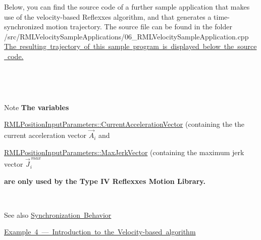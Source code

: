 Below, you can find the source code of a further sample application that makes use of the velocity-\/based Reflexxes algorithm, and that generates a time-\/synchronized motion trajectory. The source file can be found in the folder~\newline
~\newline
{\ttfamily /src/\+R\+M\+L\+Velocity\+Sample\+Applications/06\+\_\+\+R\+M\+L\+Velocity\+Sample\+Application.cpp}~\newline
~\newline
\mbox{\hyperlink{page_Code_06_RMLVelocitySampleApplication_anc_VelocityExample6}{The resulting trajectory of this sample program is displayed below the source code.}} ~\newline
~\newline
 
\begin{DoxyCodeInclude}{0}
\end{DoxyCodeInclude}


~\newline
~\newline
\label{page_Code_06_RMLVelocitySampleApplication_anc_VelocityExample6}%
%
 

~\newline
 \begin{DoxyNote}{Note}
{\bfseries{The variables}}~\newline
~\newline

\begin{DoxyItemize}
\item \mbox{\hyperlink{classRMLInputParameters_a423bf4b1ef337cbf6eee22fe2e2502c1}{R\+M\+L\+Position\+Input\+Parameters\+::\+Current\+Acceleration\+Vector}} (containing the the current acceleration vector $ \vec{A}_i$ and~\newline
~\newline
 
\item \mbox{\hyperlink{classRMLInputParameters_a5968ce643868260410f149996c446b66}{R\+M\+L\+Position\+Input\+Parameters\+::\+Max\+Jerk\+Vector}} (containing the maximum jerk vector $ \vec{J}_i^{\,max} $ ~\newline
~\newline
 
\end{DoxyItemize}{\bfseries{are only used by the Type IV Reflexxes Motion Library.}}
\end{DoxyNote}
~\newline
~\newline


\begin{DoxySeeAlso}{See also}
\mbox{\hyperlink{page_SynchronizationBehavior}{Synchronization Behavior}} 

\mbox{\hyperlink{page_Code_04_RMLVelocitySampleApplication}{Example 4 --- Introduction to the Velocity-\/based algorithm}} 
\end{DoxySeeAlso}
